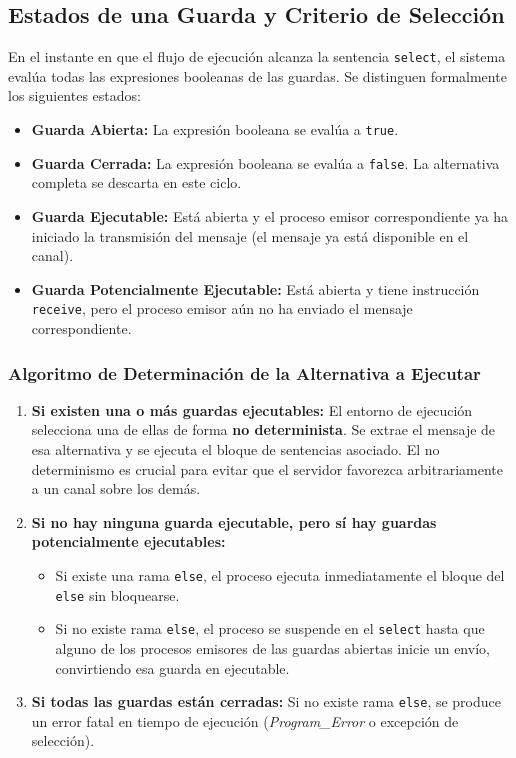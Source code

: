 \subsection{Estados de una Guarda y Criterio de Selección}
En el instante en que el flujo de ejecución alcanza la sentencia \texttt{select}, el sistema evalúa todas las expresiones booleanas de las guardas. Se distinguen formalmente los siguientes estados:

\begin{definicion}
\begin{itemize}[leftmargin=*]
    \item \textbf{Guarda Abierta:} La expresión booleana se evalúa a \texttt{true}.
    \item \textbf{Guarda Cerrada:} La expresión booleana se evalúa a \texttt{false}. La alternativa completa se descarta en este ciclo.
    \item \textbf{Guarda Ejecutable:} Está abierta y el proceso emisor correspondiente ya ha iniciado la transmisión del mensaje (el mensaje ya está disponible en el canal).
    \item \textbf{Guarda Potencialmente Ejecutable:} Está abierta y tiene instrucción \texttt{receive}, pero el proceso emisor aún no ha enviado el mensaje correspondiente.
\end{itemize}
\end{definicion}

\subsubsection{Algoritmo de Determinación de la Alternativa a Ejecutar}
\begin{enumerate}[leftmargin=*]
    \item \textbf{Si existen una o más guardas ejecutables:} El entorno de ejecución selecciona una de ellas de forma \textbf{no determinista}. Se extrae el mensaje de esa alternativa y se ejecuta el bloque de sentencias asociado. El no determinismo es crucial para evitar que el servidor favorezca arbitrariamente a un canal sobre los demás.
    \item \textbf{Si no hay ninguna guarda ejecutable, pero sí hay guardas potencialmente ejecutables:}
    \begin{itemize}
        \item Si existe una rama \texttt{else}, el proceso ejecuta inmediatamente el bloque del \texttt{else} sin bloquearse.
        \item Si no existe rama \texttt{else}, el proceso se suspende en el \texttt{select} hasta que alguno de los procesos emisores de las guardas abiertas inicie un envío, convirtiendo esa guarda en ejecutable.
    \end{itemize}
    \item \textbf{Si todas las guardas están cerradas:} Si no existe rama \texttt{else}, se produce un error fatal en tiempo de ejecución (\emph{Program\_Error} o excepción de selección).
\end{enumerate}

